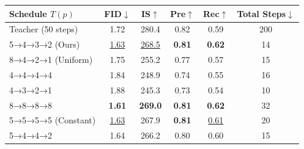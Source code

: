 \documentclass{article}
\theoremstyle{plain}
\theoremstyle{definition}
\theoremstyle{remark}
\begin{document}
\begin{table}[h]
\centering
\scriptsize
\setlength{\tabcolsep}{2pt}
\renewcommand{\arraystretch}{1.1}
\begin{tabular}{@{}lccccc@{}}
\toprule
\textbf{Schedule \(T(p)\)} & \textbf{FID\(\downarrow\)} & \textbf{IS\(\uparrow\)} & \textbf{Pre\(\uparrow\)} & \textbf{Rec\(\uparrow\)} & \textbf{Total Steps\(\downarrow\)} \\
\midrule
Teacher (50 steps) & 1.72 & 280.4 & 0.82 & 0.59 & 200 \\
\rowcolor{green!8}
5→4→3→2 (Ours) & \underline{1.63}{\color{red}{\tiny\(\downarrow\)0.09}} & \underline{268.5}{\color{blue}{\tiny\(\downarrow\)11.9}} & \textbf{0.81}{\color{blue}{\tiny\(\downarrow\)0.01}} & \textbf{0.62}{\color{red}{\tiny\(\uparrow\)0.03}} & 14{\color{red}{\tiny\(\downarrow\)186}} \\
8→4→2→1 (Uniform) & 1.75{\color{blue}{\tiny\(\uparrow\)0.03}} & 255.2{\color{blue}{\tiny\(\downarrow\)25.2}} & 0.77{\color{blue}{\tiny\(\downarrow\)0.05}} & 0.57{\color{blue}{\tiny\(\downarrow\)0.02}} & 15{\color{red}{\tiny\(\downarrow\)185}} \\
\rowcolor{gray!8}
4→4→4→4 & 1.84{\color{blue}{\tiny\(\uparrow\)0.12}} & 248.9{\color{blue}{\tiny\(\downarrow\)31.5}} & 0.74{\color{blue}{\tiny\(\downarrow\)0.08}} & 0.55{\color{blue}{\tiny\(\downarrow\)0.04}} & 16{\color{red}{\tiny\(\downarrow\)184}} \\
4→3→2→1 & 1.88{\color{blue}{\tiny\(\uparrow\)0.16}} & 245.3{\color{blue}{\tiny\(\downarrow\)35.1}} & 0.73{\color{blue}{\tiny\(\downarrow\)0.09}} & 0.54{\color{blue}{\tiny\(\downarrow\)0.05}} & 10{\color{red}{\tiny\(\downarrow\)190}} \\
\rowcolor{gray!8}
8→8→8→8 & \textbf{1.61}{\color{red}{\tiny\(\downarrow\)0.11}} & \textbf{269.0}{\color{blue}{\tiny\(\downarrow\)11.4}} & \textbf{0.81}{\color{blue}{\tiny\(\downarrow\)0.01}} & \textbf{0.62}{\color{red}{\tiny\(\uparrow\)0.03}} & 32{\color{red}{\tiny\(\downarrow\)168}} \\
5→5→5→5 (Constant) & \underline{1.63}{\color{red}{\tiny\(\downarrow\)0.09}} & 267.9{\color{blue}{\tiny\(\downarrow\)12.5}} & \textbf{0.81}{\color{blue}{\tiny\(\downarrow\)0.01}} & \underline{0.61}{\color{red}{\tiny\(\uparrow\)0.02}} & 20{\color{red}{\tiny\(\downarrow\)180}} \\
\rowcolor{gray!8}
5→4→4→2 & 1.64{\color{red}{\tiny\(\downarrow\)0.08}} & 266.2{\color{blue}{\tiny\(\downarrow\)14.2}} & 0.80{\color{blue}{\tiny\(\downarrow\)0.02}} & 0.60{\color{red}{\tiny\(\uparrow\)0.01}} & 15{\color{red}{\tiny\(\downarrow\)185}} \\

\end{tabular}
\end{table}
\end{document}
